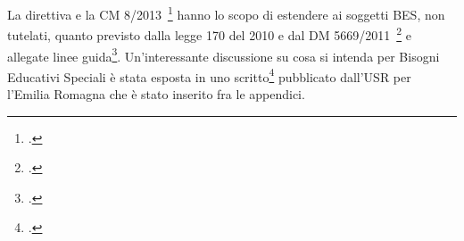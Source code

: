 La direttiva e la CM 8/2013~\footcite{cm8_2013} hanno lo scopo di estendere ai soggetti BES, non tutelati, quanto previsto dalla legge 170 del 2010 e dal DM 5669/2011~\footcite{decreto5669_2011} e allegate linee guida\footcite{LineGuida2011}. Un'interessante discussione su cosa si intenda per Bisogni Educativi Speciali è stata esposta in uno scritto\footcite{USRperLEmiliaRomagna2013a} pubblicato dall'USR per l'Emilia Romagna che è stato inserito fra le appendici. 
 